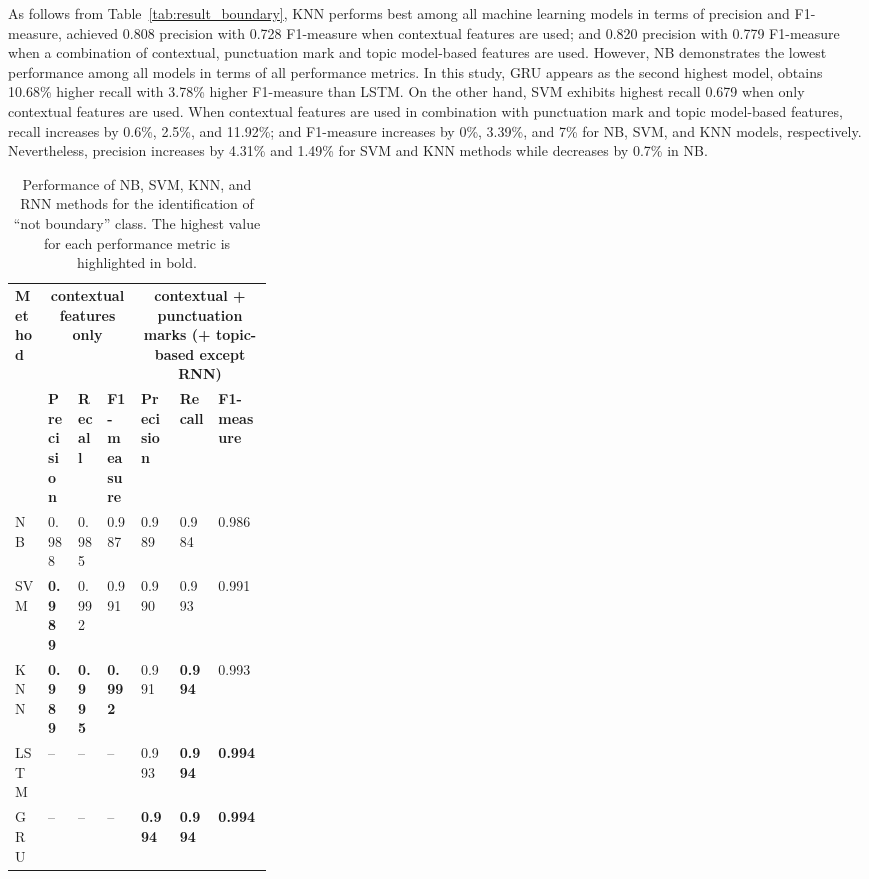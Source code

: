 \documentclass{amia}
\begin{document}
As follows from Table~\ref{tab:result_boundary}, KNN performs best among all machine learning models in terms of precision and F1-measure, achieved 0.808 precision with 0.728 F1-measure when contextual features are used; and 0.820 precision with 0.779 F1-measure when a combination of contextual, punctuation mark and topic model-based features are used. However, NB demonstrates the lowest performance among all models in terms of all performance metrics. In this study, GRU appears as the second highest model, obtains 10.68\% higher recall with 3.78\%  higher F1-measure than LSTM. On the other hand, SVM exhibits highest recall 0.679 when only contextual features are used. When contextual features are used in combination with punctuation mark and topic model-based features, recall increases by 0.6\%, 2.5\%, and 11.92\%; and F1-measure increases by 0\%, 3.39\%, and 7\% for NB, SVM, and KNN models, respectively. Nevertheless, precision increases by 4.31\% and 1.49\% for SVM and KNN methods while decreases by 0.7\% in NB. \\

\begin{table}[ht]
\centering
\caption{Performance of NB, SVM, KNN, and RNN methods for the identification of ``not boundary'' class. The highest value for each performance metric is highlighted in bold.}
\label{tab:result_not_boundary}
  \begin{tabular}{|l|l|l|l|p{0.15\linewidth}|p{0.15\linewidth}|l|}
  \hline
   \multirow{2}{*}{\textbf{Method}} & \multicolumn{3}{|c|}{\textbf{contextual features only}} & \multicolumn{3}{|c|}{\textbf{contextual + punctuation marks (+ topic-based except RNN)}} \\\cline{2-7}
   & \textbf{Precision}  & \textbf{Recall} & \textbf{F1-measure} & \textbf{Precision}  & \textbf{Recall} & \textbf{F1-measure}\\ \hline    
    
 NB & 0.988 & 0.985 & 0.987 & 0.989 & 0.984 & 0.986 \\ \hline
 SVM & \textbf{0.989} & 0.992 & 0.991 & 0.990 & 0.993 & 0.991\\ \hline
 KNN & \textbf{0.989} & \textbf{0.995} & \textbf{0.992} & 0.991 & \textbf{0.994} & 0.993\\ \hline
 LSTM & -- & -- & -- & 0.993 & \textbf{0.994} & \textbf{0.994} \\ \hline
 GRU & -- & -- & -- & \textbf{0.994} & \textbf{0.994} & \textbf{0.994} \\ \hline 
  \end{tabular}
\end{table}
\end{document}
